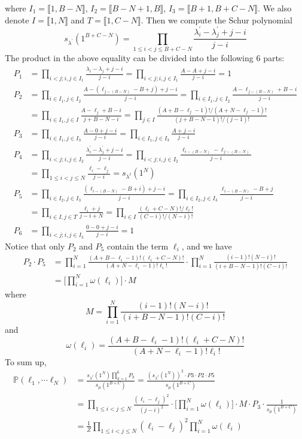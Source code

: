 \documentclass[12pt]{article}
\begin{document}
	where $I_{1}=\llbracket{1,B-N}\rrbracket$, $I_{2}=\llbracket{B-N+1,B}\rrbracket$, $I_{3}=\llbracket{B+1,B+C-N}\rrbracket$. We also denote $I=\llbracket{1,N}\rrbracket$ and $T=\llbracket{1,C-N}\rrbracket$. Then we compute the Schur polynomial $$s_{\lambda^{\prime}}(1^{B+C-N})=\prod_{1\leqslant i<j\leqslant B+C-N}\frac{\lambda^{\prime}_{i}-\lambda_{j}^{\prime}+j-i}{j-i}$$
	The product in the above equality can be divided into the following $6$ parts:
	\begin{align*}
	P_{1} &= \prod_{i<j; i,j\in I_{1}}\frac{\lambda_{i}-\lambda_{j}+j-i}{j-i}=\prod_{i<j; i,j\in I_{1}}\frac{A-A+j-i}{j-i}=1\\
	P_{2} &= \prod_{i\in I_{1},j\in I_{2}}\frac{A-(\ell_{j-(B-N)}-B+j)+j-i}{j-i}=\prod_{i\in I_{1},j\in I_{2}}\frac{A-\ell_{j-(B-N)}+B-i}{j-i}\\ 
	&= \prod_{i\in I_{1},j\in I}\frac{A-\ell_{j}+B-i}{j+B-N-i} = \prod_{j\in I}\frac{(A+B-\ell_{j}-1)!/(A+N-\ell_{j}-1)!}{(j+B-N-1)!/(j-1)!}\\
	P_{3}&=\prod_{i\in I_{1},j\in I_{3}}\frac{A-0+j-i}{j-i}=\prod_{i\in I_{1},j\in I_{3}}\frac{A+j-i}{j-i}\\
	P_{4}&=\prod_{i<j;i,j\in I_{2}}\frac{\lambda^{\prime}_{i}-\lambda_{j}^{\prime}+j-i}{j-i}=\prod_{i<j;i,j\in I_{2}}\frac{\ell_{i-(B-N)}-\ell_{j-(B-N)}}{j-i}\\
	&= \prod_{1\leqslant i<j\leqslant N}\frac{\ell_{i}-\ell_{j}}{j-i}=s_{\lambda^{\ell}}(1^{N})\\
	P_{5}&=\prod_{i\in I_{2},j\in I_{3}}\frac{(\ell_{i-(B-N)}-B+i)+j-i}{j-i}=\prod_{i\in I_{2},j\in I_{3}}\frac{\ell_{i-(B-N)}-B+j}{j-i}\\
	&= \prod_{i\in I,j\in T}\frac{\ell_{i}+j}{j-i+N}=\prod_{i\in I}\frac{(\ell_{i}+C-N)!/\ell_{i}!}{(C-i)!/(N-i)!}\\
	P_{6}&=\prod_{i<j; i,j\in I_{3}}\frac{0-0+j-i}{j-i}=1
	\end{align*}
	Notice that only $P_{2}$ and $P_{5}$ contain the term $\ell_{i}$, and we have 
	\begin{align*}
	P_{2}\cdot P_{5} &= \prod_{i=1}^{N}\frac{(A+B-\ell_{i}-1)!(\ell_{i}+C-N)!}{(A+N-\ell_{i}-1)!\ell_{i}!}\cdot\prod_{i=1}^{N}\frac{(i-1)!(N-i)!}{(i+B-N-1)!(C-i)!}\\
	&=\Big[\prod_{i=1}^{N}\omega(\ell_{i})\Big]\cdot M
	\end{align*} 
	where $$M=\prod_{i=1}^{N}\frac{(i-1)!(N-i)!}{(i+B-N-1)!(C-i)!}$$ and $$\omega(\ell_{i})=\frac{(A+B-\ell_{i}-1)!(\ell_{i}+C-N)!}{(A+N-\ell_{i}-1)!\ell_{i}!}$$
	To sum up,
	\begin{align*}
	\mathbb P(\ell_1,\cdots \ell_N)&=\frac{s_{\lambda^{\ell}}(1^{N})\prod_{k=1}^{6}P_{k}}{s_{\mu}(1^{B+C})}=\frac{(s_{\lambda^{\ell}}(1^{N}))^{2}\cdot P3\cdot P2\cdot P5}{s_{\mu}(1^{B+C})}\\
	&=\prod_{1\leqslant i<j\leqslant N}\frac{(\ell_{i}-\ell_{j})^{2}}{(j-i)^{2}}\cdot\Big[\prod_{i=1}^{N}\omega(\ell_{i})\Big]\cdot M\cdot P_{3}\cdot\frac{1}{s_{\mu}(1^{B+C})}\\
	&=\frac{1}{Z}\prod_{1\leqslant i <j\leqslant N}(\ell_{i}-\ell_{j})^{2}\prod_{i=1}^{N}\omega(\ell_{i})
	\end{align*}
\end{document}

